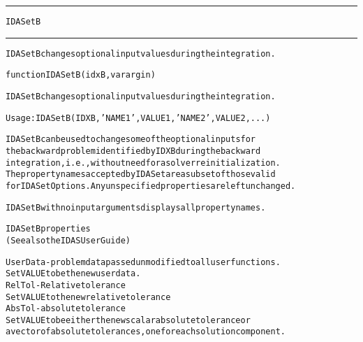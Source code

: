 \begin{samepage}
\hrule
\begin{center}
{\large \verb!IDASetB!}
\label{p:IDASetB}
\end{center}
\hrule\vspace{0.1in}



\begin{alltt}
IDASetB changes optional input values during the integration.
\end{alltt}

\end{samepage}



\begin{samepage}


\begin{alltt}
function IDASetB(idxB, varargin) 
\end{alltt}

\end{samepage}



\begin{alltt}
IDASetB changes optional input values during the integration.

   Usage: IDASetB( IDXB, 'NAME1',VALUE1,'NAME2',VALUE2,... )

   IDASetB can be used to change some of the optional inputs for
   the backward problem identified by IDXB during the backward
   integration, i.e., without need for a solver reinitialization.
   The property names accepted by IDASet are a subset of those valid
   for IDASetOptions. Any unspecified properties are left unchanged.
   
   IDASetB with no input arguments displays all property names.

IDASetB properties
(See also the IDAS User Guide)

UserData - problem data passed unmodified to all user functions.
  Set VALUE to be the new user data.
RelTol - Relative tolerance
  Set VALUE to the new relative tolerance
AbsTol - absolute tolerance
  Set VALUE to be either the new scalar absolute tolerance or
  a vector of absolute tolerances, one for each solution component.
\end{alltt}






\vspace{0.1in}